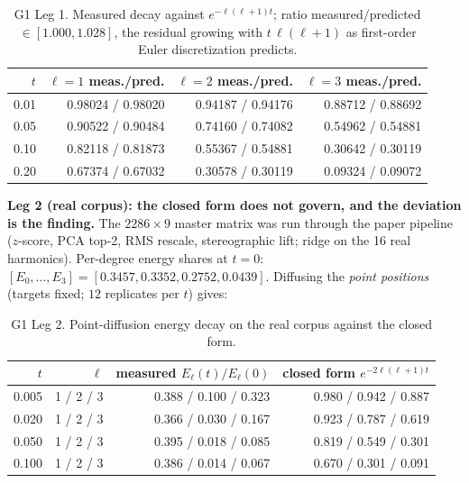 \documentclass[11pt,a4paper]{article}
\theoremstyle{plain}
\theoremstyle{remark}
\begin{document}
\begin{table}[h]\centering\small
\begin{tabular}{rrrr}
\toprule
$t$ & $\ell=1$ meas./pred. & $\ell=2$ meas./pred. & $\ell=3$ meas./pred.\\
\midrule
0.01 & 0.98024 / 0.98020 & 0.94187 / 0.94176 & 0.88712 / 0.88692\\
0.05 & 0.90522 / 0.90484 & 0.74160 / 0.74082 & 0.54962 / 0.54881\\
0.10 & 0.82118 / 0.81873 & 0.55367 / 0.54881 & 0.30642 / 0.30119\\
0.20 & 0.67374 / 0.67032 & 0.30578 / 0.30119 & 0.09324 / 0.09072\\
\bottomrule
\end{tabular}
\caption{G1 Leg 1. Measured decay against $e^{-\ell(\ell+1)t}$; ratio measured/predicted $\in[1.000,1.028]$, the residual growing with $t\,\ell(\ell+1)$ as first-order Euler discretization predicts.}
\label{tab:leg1}
\end{table}

\textbf{Leg 2 (real corpus): the closed form does not govern, and the deviation is the finding.} The $2286\times9$ master matrix was run through the paper pipeline ($z$-score, PCA top-2, RMS rescale, stereographic lift; ridge on the 16 real harmonics). Per-degree energy shares at $t=0$: $[E_0,\dots,E_3]=[0.3457,0.3352,0.2752,0.0439]$. Diffusing the \emph{point positions} (targets fixed; $12$ replicates per $t$) gives:

\begin{table}[h]\centering\small
\begin{tabular}{rrrr}
\toprule
$t$ & $\ell$ & measured $E_\ell(t)/E_\ell(0)$ & closed form $e^{-2\ell(\ell+1)t}$\\
\midrule
0.005 & 1 / 2 / 3 & 0.388 / 0.100 / 0.323 & 0.980 / 0.942 / 0.887\\
0.020 & 1 / 2 / 3 & 0.366 / 0.030 / 0.167 & 0.923 / 0.787 / 0.619\\
0.050 & 1 / 2 / 3 & 0.395 / 0.018 / 0.085 & 0.819 / 0.549 / 0.301\\
0.100 & 1 / 2 / 3 & 0.386 / 0.014 / 0.067 & 0.670 / 0.301 / 0.091\\
\bottomrule
\end{tabular}
\caption{G1 Leg 2. Point-diffusion energy decay on the real corpus against the closed form.}
\label{tab:leg2}
\end{table}
\end{document}
